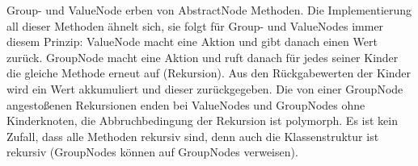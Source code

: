 Group- und ValueNode erben von AbstractNode Methoden. Die Implementierung all dieser Methoden ähnelt sich, sie folgt für Group- und ValueNodes immer diesem Prinzip:
ValueNode macht eine Aktion und gibt danach einen Wert zurück.
GroupNode macht eine Aktion und ruft danach für jedes seiner Kinder die gleiche Methode erneut auf (Rekursion). Aus den Rückgabewerten der Kinder wird ein Wert akkumuliert und dieser zurückgegeben.
Die von einer GroupNode angestoßenen Rekursionen enden bei ValueNodes und GroupNodes ohne Kinderknoten, die Abbruchbedingung der Rekursion ist polymorph.
Es ist kein Zufall, dass alle Methoden rekursiv sind, denn auch die Klassenstruktur ist rekursiv (GroupNodes können auf GroupNodes verweisen).












